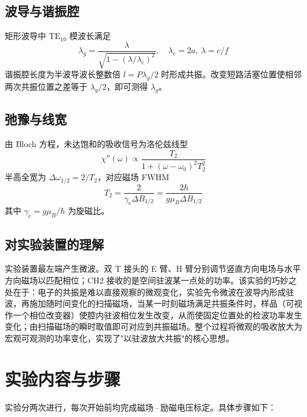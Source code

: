 \documentclass[a4paper,8pt,twocolumn]{article}
\begin{document}
\subsection{波导与谐振腔}

矩形波导中 $\mathrm{TE}_{10}$ 模波长满足
\begin{equation}
  \lambda_g=\frac{\lambda}{\sqrt{1-(\lambda/\lambda_c)^2}},
  \quad \lambda_c=2a,\ \lambda=c/f
  \tag{A2.4}
\end{equation}
谐振腔长度为半波导波长整数倍 $l=P\lambda_g/2$ 时形成共振。改变短路活塞位置使相邻两次共振位置之差等于 $\lambda_g/2$，即可测得 $\lambda_g$。

\subsection{弛豫与线宽}

由 Bloch 方程，未达饱和的吸收信号为洛伦兹线型
\begin{equation}
  \chi''(\omega)\propto\frac{T_2}{1+(\omega-\omega_0)^2 T_2^2}
  \tag{A2.5}
\end{equation}
半高全宽为 $\Delta\omega_{1/2}=2/T_2$，对应磁场 FWHM
\begin{equation}
  T_2=\frac{2}{\gamma_e \Delta B_{1/2}}
  =\frac{2\hbar}{g\mu_B \Delta B_{1/2}}
  \tag{A2.6}
\end{equation}
其中 $\gamma_e=g\mu_B/\hbar$ 为旋磁比。

\subsection{对实验装置的理解}

实验装置最左端产生微波。双 T 接头的 E 臂、H 臂分别调节竖直方向电场与水平方向磁场以匹配相位；CH2 接收的是空间驻波某一点处的功率。该实验的巧妙之处在于：电子的共振是难以直接观察的微观变化，实验先令微波在波导内形成驻波，再施加随时间变化的扫描磁场，当某一时刻磁场满足共振条件时，样品（可视作一个相位改变器）使腔内驻波相位发生改变，从而使固定位置处的检波功率发生变化；由扫描磁场的瞬时取值即可对应到共振磁场。整个过程将微观的吸收放大为宏观可观测的功率变化，实现了"以驻波放大共振"的核心思想。

\section{实验内容与步骤}

实验分两次进行，每次开始前均完成磁场\,--\,励磁电压标定。具体步骤如下：
\end{document}
